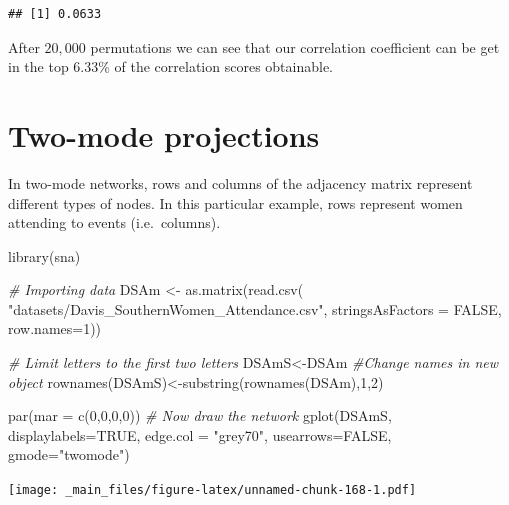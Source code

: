 \documentclass[
  notitlepage,
  onecolumn,
  openany]{book}
\newenvironment{Shaded}{\begin{snugshade}}{\end{snugshade}}
\newcommand{\AttributeTok}[1]{\textcolor[rgb]{0.77,0.63,0.00}{#1}}
\newcommand{\CommentTok}[1]{\textcolor[rgb]{0.56,0.35,0.01}{\textit{#1}}}
\newcommand{\ConstantTok}[1]{\textcolor[rgb]{0.00,0.00,0.00}{#1}}
\newcommand{\DecValTok}[1]{\textcolor[rgb]{0.00,0.00,0.81}{#1}}
\newcommand{\FunctionTok}[1]{\textcolor[rgb]{0.00,0.00,0.00}{#1}}
\newcommand{\NormalTok}[1]{#1}
\newcommand{\OtherTok}[1]{\textcolor[rgb]{0.56,0.35,0.01}{#1}}
\newcommand{\StringTok}[1]{\textcolor[rgb]{0.31,0.60,0.02}{#1}}
\begin{document}
\begin{verbatim}
## [1] 0.0633
\end{verbatim}

After \(20,000\) permutations we can see that our correlation coefficient can be get in the top 6.33\% of the correlation scores obtainable.

\hypertarget{two-mode-projections}{%
\chapter{Two-mode projections}\label{two-mode-projections}}

In two-mode networks, rows and columns of the adjacency matrix represent different types of nodes. In this particular example, rows represent women attending to events (i.e.~columns).

\begin{Shaded}
\begin{Highlighting}[]
\FunctionTok{library}\NormalTok{(sna)}

\CommentTok{\# Importing data}
\NormalTok{DSAm }\OtherTok{\textless{}{-}} \FunctionTok{as.matrix}\NormalTok{(}\FunctionTok{read.csv}\NormalTok{(}
    \StringTok{"datasets/Davis\_SouthernWomen\_Attendance.csv"}\NormalTok{,}
    \AttributeTok{stringsAsFactors =} \ConstantTok{FALSE}\NormalTok{, }\AttributeTok{row.names=}\DecValTok{1}\NormalTok{))}


\CommentTok{\# Limit letters to the first two letters}
\NormalTok{DSAmS}\OtherTok{\textless{}{-}}\NormalTok{DSAm}
\CommentTok{\#Change names in new object}
\FunctionTok{rownames}\NormalTok{(DSAmS)}\OtherTok{\textless{}{-}}\FunctionTok{substring}\NormalTok{(}\FunctionTok{rownames}\NormalTok{(DSAm),}\DecValTok{1}\NormalTok{,}\DecValTok{2}\NormalTok{)}

\FunctionTok{par}\NormalTok{(}\AttributeTok{mar =} \FunctionTok{c}\NormalTok{(}\DecValTok{0}\NormalTok{,}\DecValTok{0}\NormalTok{,}\DecValTok{0}\NormalTok{,}\DecValTok{0}\NormalTok{))}
\CommentTok{\# Now draw the network}
\FunctionTok{gplot}\NormalTok{(DSAmS, }\AttributeTok{displaylabels=}\ConstantTok{TRUE}\NormalTok{,}
      \AttributeTok{edge.col =} \StringTok{"grey70"}\NormalTok{,}
      \AttributeTok{usearrows=}\ConstantTok{FALSE}\NormalTok{, }\AttributeTok{gmode=}\StringTok{"twomode"}\NormalTok{)}
\end{Highlighting}
\end{Shaded}

\texttt{[image: \_main\_files/figure-latex/unnamed-chunk-168-1.pdf]}
\end{document}
